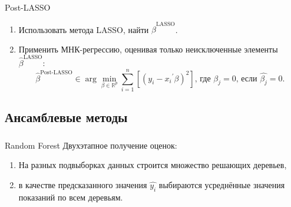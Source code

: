 \documentclass[c, dvipsnames]{beamer}  %
\begin{document}
\begin{frame}
\frametitle{\insertsection} 
\framesubtitle{\insertsubsection}
\begin{block}{Post-LASSO}
\begin{enumerate}
    \item Использовать метода LASSO, найти $\hat{\beta}^{\text{LASSO}}$.
    \item Применить МНК-регрессию, оценивая только неисключенные элементы $\hat{\beta}^{\text{LASSO}}$:
    \begin{equation}
  \hat{\beta}^{\text{Post-LASSO}} \in \arg \min_{\beta \in
\mathbb{R}^p} \sum_{i=1}^n \left[ (y_i - {x_i}^{'} \beta)^2 \right] \text{,  где }  \beta_j = 0 \text{, если } \hat{\beta_j} = 0.
\end{equation}
\end{enumerate}
\end{block}
 
 


\end{frame}



\subsection{Ансамблевые методы}
\begin{frame}
\frametitle{\insertsection} 
\framesubtitle{\insertsubsection}
\begin{block}{Random Forest}
    Двухэтапное получение оценок:
    \begin{enumerate}
        \item На разных подвыборках данных строится множество решающих деревьев,
        \item в качестве предсказанного значения $\hat{y_i}$ выбираются усреднённые значения показаний по всем деревьям.
    \end{enumerate}
\end{block}


\end{frame}
\end{document}
